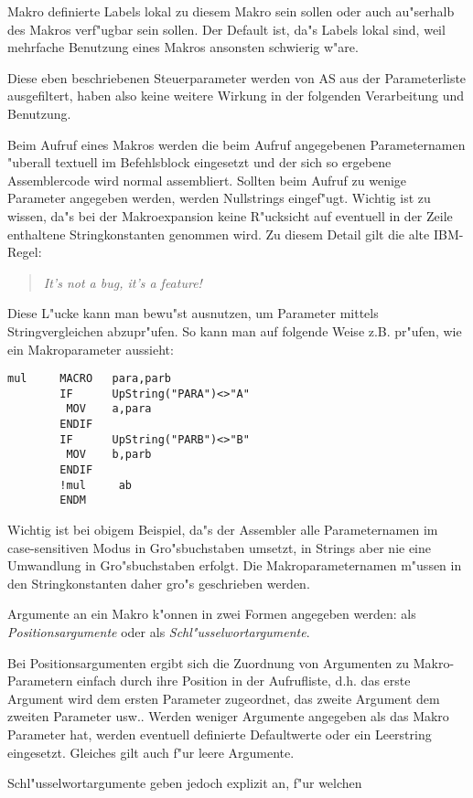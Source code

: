 \documentclass[12pt,a4paper,twoside]{report}
\newcommand{\ii}[1]{{\it #1}}
\begin{document}
{\begin{itemize}
{      Makro definierte Labels lokal zu diesem Makro sein sollen
      oder auch au"serhalb des Makros verf"ugbar sein sollen. 
      Der Default ist, da"s Labels lokal sind, weil mehrfache
      Benutzung eines Makros ansonsten schwierig w"are.}
\end{itemize}
Diese eben beschriebenen Steuerparameter werden von AS aus der
Parameterliste ausgefiltert, haben also keine weitere Wirkung in
der folgenden Verarbeitung und Benutzung.
\par
Beim Aufruf eines Makros werden die beim Aufruf angegebenen
Parameternamen "uberall textuell im Befehlsblock eingesetzt und der
sich so ergebene Assemblercode wird normal assembliert.  Sollten
beim Aufruf zu wenige Parameter angegeben werden, werden Nullstrings
eingef"ugt.  Wichtig ist zu wissen, da"s bei der Makroexpansion keine
R"ucksicht auf eventuell in der Zeile enthaltene Stringkonstanten
genommen wird.  Zu diesem Detail gilt die alte IBM-Regel:
\begin{quote}
\ii{It's not a bug, it's a feature!}
\end {quote}
Diese L"ucke kann man bewu"st ausnutzen, um Parameter mittels
Stringvergleichen abzupr"ufen.  So kann man auf folgende Weise
z.B. pr"ufen, wie ein Makroparameter aussieht:
\begin{verbatim}
mul     MACRO   para,parb
        IF      UpString("PARA")<>"A"
         MOV    a,para
        ENDIF
        IF      UpString("PARB")<>"B"
         MOV    b,parb
        ENDIF
        !mul     ab
        ENDM
\end{verbatim} 
Wichtig ist bei obigem Beispiel, da"s der Assembler alle
Parameternamen im case-sensitiven Modus in Gro"sbuchstaben
umsetzt, in Strings aber nie eine Umwandlung in Gro"sbuchstaben
erfolgt. Die Makroparameternamen m"ussen in den Stringkonstanten
daher gro"s geschrieben werden.
\par
Argumente an ein Makro k"onnen in zwei Formen angegeben werden:
als {\em Positionsargumente} oder als {\em
Schl"usselwortargumente}.
\par
Bei Positionsargumenten ergibt sich
die Zuordnung von Argumenten zu Makro-Parametern einfach durch
ihre Position in der Aufrufliste, d.h. das erste Argument wird dem
ersten Parameter zugeordnet, das zweite Argument dem zweiten
Parameter usw..  Werden weniger Argumente angegeben als das Makro
Parameter hat, werden eventuell definierte Defaultwerte oder ein
Leerstring eingesetzt.  Gleiches gilt auch f"ur leere Argumente.
\par
Schl"usselwortargumente geben jedoch explizit an, f"ur welchen
}
\end{document}
